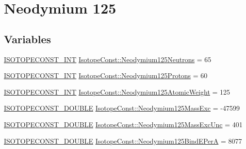 \hypertarget{group___isotope_const-_neodymium-_nd125}{}\section{Neodymium 125}
\label{group___isotope_const-_neodymium-_nd125}
\subsection*{Variables}
\begin{DoxyCompactItemize}
\item 
\mbox{\hyperlink{group___isotope_const-_macros_ga5f18360b3e99483a35c32d789e62621c}{I\+S\+O\+T\+O\+P\+E\+C\+O\+N\+S\+T\+\_\+\+I\+NT}} \mbox{\hyperlink{group___isotope_const-_neodymium-_nd125_gad42e709144095c8ca70efe39ec8c4242}{Isotope\+Const\+::\+Neodymium125\+Neutrons}} = 65
\item 
\mbox{\hyperlink{group___isotope_const-_macros_ga5f18360b3e99483a35c32d789e62621c}{I\+S\+O\+T\+O\+P\+E\+C\+O\+N\+S\+T\+\_\+\+I\+NT}} \mbox{\hyperlink{group___isotope_const-_neodymium-_nd125_ga2877bfc4bfeae8778db0f81ef4450221}{Isotope\+Const\+::\+Neodymium125\+Protons}} = 60
\item 
\mbox{\hyperlink{group___isotope_const-_macros_ga5f18360b3e99483a35c32d789e62621c}{I\+S\+O\+T\+O\+P\+E\+C\+O\+N\+S\+T\+\_\+\+I\+NT}} \mbox{\hyperlink{group___isotope_const-_neodymium-_nd125_gace1ccf8018df7e9df8275ef6220a3e8c}{Isotope\+Const\+::\+Neodymium125\+Atomic\+Weight}} = 125
\item 
\mbox{\hyperlink{group___isotope_const-_macros_ga8f45a7272ce02c0b4c65c44636ed719a}{I\+S\+O\+T\+O\+P\+E\+C\+O\+N\+S\+T\+\_\+\+D\+O\+U\+B\+LE}} \mbox{\hyperlink{group___isotope_const-_neodymium-_nd125_gaa884364cc09eba6bd7e4e91a40a567a0}{Isotope\+Const\+::\+Neodymium125\+Mass\+Exc}} = -\/47599
\item 
\mbox{\hyperlink{group___isotope_const-_macros_ga8f45a7272ce02c0b4c65c44636ed719a}{I\+S\+O\+T\+O\+P\+E\+C\+O\+N\+S\+T\+\_\+\+D\+O\+U\+B\+LE}} \mbox{\hyperlink{group___isotope_const-_neodymium-_nd125_gad7a9a91a6eeff07047fdf747374acb2a}{Isotope\+Const\+::\+Neodymium125\+Mass\+Exc\+Unc}} = 401
\item 
\mbox{\hyperlink{group___isotope_const-_macros_ga8f45a7272ce02c0b4c65c44636ed719a}{I\+S\+O\+T\+O\+P\+E\+C\+O\+N\+S\+T\+\_\+\+D\+O\+U\+B\+LE}} \mbox{\hyperlink{group___isotope_const-_neodymium-_nd125_ga1302544e4a6c87efc036027cb3074565}{Isotope\+Const\+::\+Neodymium125\+Bind\+E\+PerA}} = 8077
\item 

\end{DoxyCompactItemize}
